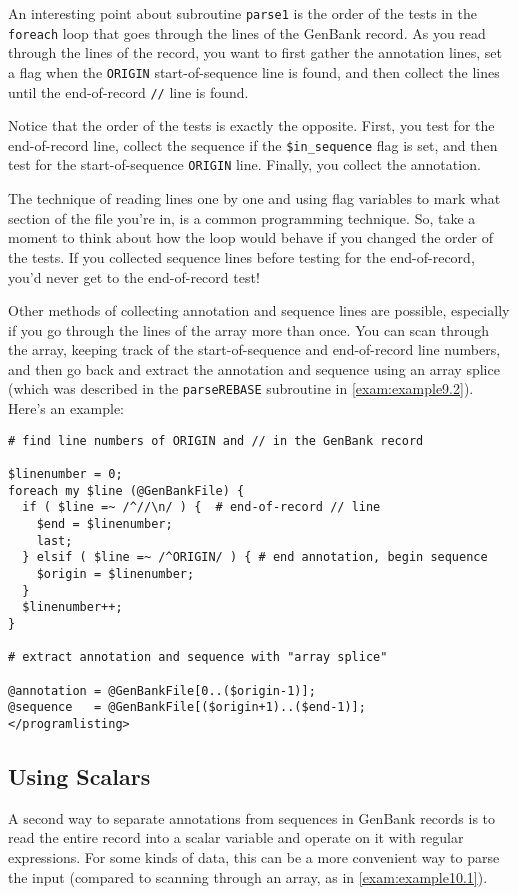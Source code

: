 An interesting point about subroutine \verb|parse1| is the order of the tests in the \verb|foreach| loop that goes through the lines of the GenBank record.  As you read through the lines of the record, you want to first gather the annotation lines, set a flag when the \verb|ORIGIN| start-of-sequence line is found, and then collect the lines until the end-of-record \verb|//| line is found.

Notice that the order of the tests is exactly the opposite. First, you test for the end-of-record line, collect the sequence if the \verb|$in_sequence| flag is set, and then test for the start-of-sequence \verb|ORIGIN| line. Finally, you collect the annotation.

The technique of reading lines one by one and using flag variables to mark what section of the file you're in, is a common programming technique. So, take a moment to think about how the loop would behave if you changed the order of the tests. If you collected sequence lines before testing for the end-of-record, you'd never get to the end-of-record test!

Other methods of collecting annotation and sequence lines are possible, especially if you go through the lines of the array more than once. You can scan through the array, keeping track of the start-of-sequence and end-of-record line numbers, and then go back and extract the annotation and sequence using an array splice (which was described in the \verb|parseREBASE| subroutine in \autoref{exam:example9.2}). Here's an example:

\begin{lstlisting}
# find line numbers of ORIGIN and // in the GenBank record

$linenumber = 0;
foreach my $line (@GenBankFile) {
  if ( $line =~ /^//\n/ ) {  # end-of-record // line
    $end = $linenumber;
    last;
  } elsif ( $line =~ /^ORIGIN/ ) { # end annotation, begin sequence
    $origin = $linenumber;
  }
  $linenumber++;
}

# extract annotation and sequence with "array splice"

@annotation = @GenBankFile[0..($origin-1)];
@sequence   = @GenBankFile[($origin+1)..($end-1)];
</programlisting>
\end{lstlisting}

\subsection{Using Scalars}
A second way to separate annotations from sequences in GenBank records is to read the entire record into a scalar variable and operate on it with regular expressions. For some kinds of data, this can be a more convenient way to parse the input (compared to scanning through an array, as in \autoref{exam:example10.1}).

